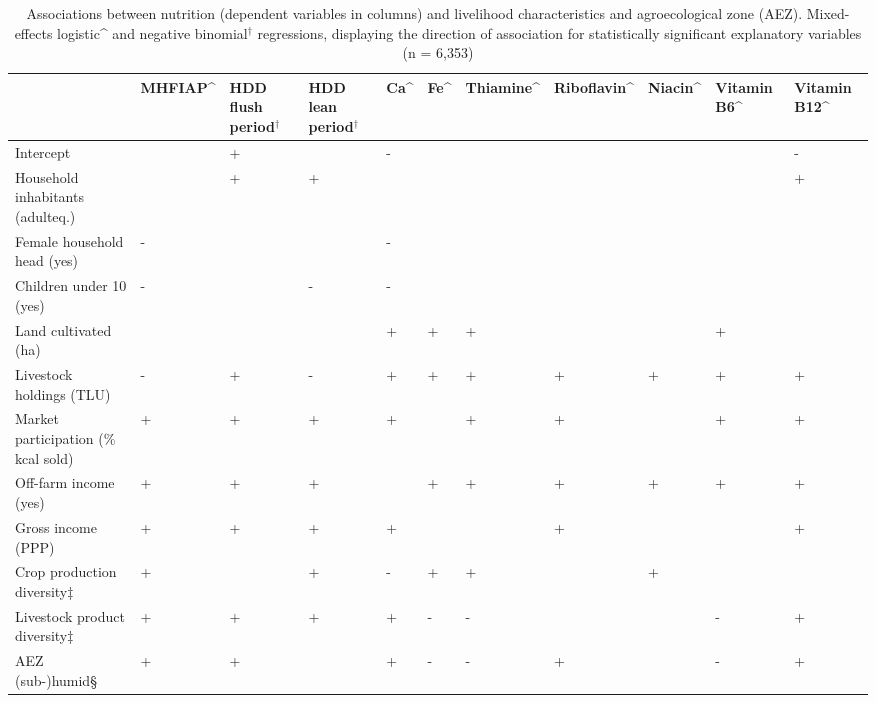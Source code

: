 \begin{table}
\centering
\captionsetup{singlelinecheck = false, justification=justified}
  \caption{
  Associations between nutrition (dependent variables in columns) and livelihood characteristics and agroecological zone (AEZ). Mixed-effects logistic\textasciicircum{} and negative binomial$^{\dag}$ regressions, displaying the direction of association for statistically significant explanatory variables (n = 6,353)
  }
  \label{tab:06_3}
  \small
  \centering
\begin{tabularx}{\textwidth}{
p{}
p{}
p{}
p{}
p{}
p{}
p{}
p{}
p{}
p{}
p{}}
\toprule
 & MHFIAP\textasciicircum{} & HDD flush period$^{\dag}$ & HDD lean period$^{\dag}$ & Ca\textasciicircum{} & Fe\textasciicircum{} & Thiamine\textasciicircum{} & Riboflavin\textasciicircum{} & Niacin\textasciicircum{} & Vitamin B6\textasciicircum{} & Vitamin B12\textasciicircum{} \\
 \midrule
Intercept &  & + &  & - & & & & & & - \\
Household inhabitants (adulteq.) &  & + & + & & & & & & & + \\
Female household head (yes) & - &  &  & - & & & & & & \\
Children under 10 (yes) & - &  & - & - & & & & & & \\
\arrayrulecolor{black!30}\midrule
Land cultivated (ha) &  &  &  & + & + & + & & & + & \\
Livestock holdings (TLU) & - & + & - & + & + & + & + & + & + & + \\
Market participation (\% kcal sold) & + & + & + & + & & + & + & & + & + \\
Off-farm income (yes) & + & + & + & & + & + & + & + & + & + \\
Gross income (PPP) & + & + & + & + & & & + & & & + \\
Crop production diversity${\ddag}$ & + &  & + & - & + & + & & + & & \\
Livestock product diversity${\ddag}$ & + & + & + & + & - & - & & & - & + \\
\arrayrulecolor{black!30}\midrule
AEZ (sub-)humid{\S} & + & + &  & + & - & - & + & & - & + \\

\end{tabularx}
\end{table}
